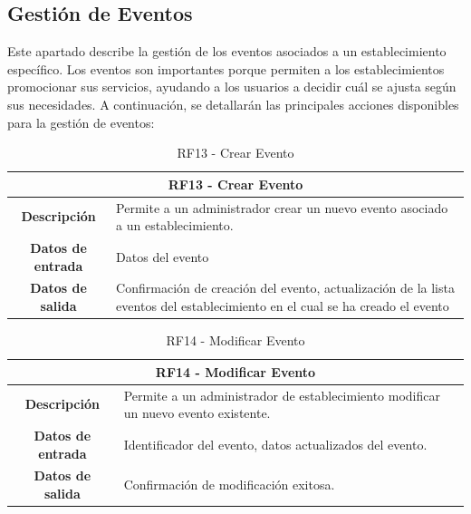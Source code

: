 \subsection{Gestión de Eventos}

Este apartado describe la gestión de los eventos asociados a un establecimiento específico. Los eventos son importantes porque permiten a los establecimientos promocionar sus servicios, ayudando a los usuarios a decidir cuál se ajusta según sus necesidades. A continuación, se detallarán las principales acciones disponibles para la gestión de eventos:

\begin{table}[H]
    \centering
    \begin{tabular}{|c|p{10cm}|}
        \hline
        \multicolumn{2}{|c|}{\textbf{RF13 - Crear Evento}}                                                                                                       \\
        \hline
        \textbf{Descripción}      & Permite a un administrador crear un nuevo evento asociado a un establecimiento.                                              \\
        \hline
        \textbf{Datos de entrada} & Datos del evento                                                                                                             \\
        \hline
        \textbf{Datos de salida}  & Confirmación de creación del evento, actualización de la lista eventos del establecimiento en el cual se ha creado el evento \\
        \hline
    \end{tabular}
    \caption{RF13 - Crear Evento}
\end{table}

\begin{table}[H]
    \centering
    \begin{tabular}{|c|p{10cm}|}
        \hline
        \multicolumn{2}{|c|}{\textbf{RF14 - Modificar Evento}}                                                         \\
        \hline
        \textbf{Descripción}      & Permite a un administrador de establecimiento modificar un nuevo evento existente. \\
        \hline
        \textbf{Datos de entrada} & Identificador del evento, datos actualizados del evento.                           \\
        \hline
        \textbf{Datos de salida}  & Confirmación de modificación exitosa.                                              \\
        \hline
    \end{tabular}
    \caption{RF14 - Modificar Evento}
\end{table}

